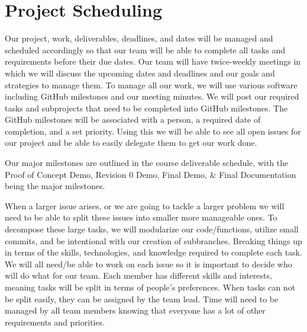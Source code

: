 \documentclass{article}
\begin{document}
\section{Project Scheduling}

Our project, work, deliverables, deadlines, and dates will be managed and scheduled accordingly so that our team will be able to complete all tasks and requirements before their due dates. Our team will have twice-weekly meetings in which we will discuss the upcoming dates and deadlines and our goals and strategies to manage them. To manage all our work, we will use various software including GitHub milestones and our meeting minutes. We will post our required tasks and subprojects that need to be completed into GitHub milestones. The GitHub milestones will be associated with a person, a required date of completion, and a set priority. Using this we will be able to see all open issues for our project and be able to easily delegate them to get our work done. 

Our major milestones are outlined in the course deliverable schedule, with the Proof of Concept Demo, Revision 0 Demo, Final Demo, \& Final Documentation being the major milestones. 

When a larger issue arises, or we are going to tackle a larger problem we will need to be able to split these issues into smaller more manageable ones. To decompose these large tasks, we will modularize our code/functions, utilize small commits, and be intentional with our creation of subbranches. Breaking things up in terms of the skills, technologies, and knowledge required to complete each task. We will all need/be able to work on each issue so it is important to decide who will do what for our team. Each member has different skills and interests, meaning tasks will be split in terms of people’s preferences. When tasks can not be split easily, they can be assigned by the team lead. Time will need to be managed by all team members knowing that everyone has a lot of other requirements and priorities.
\end{document}
